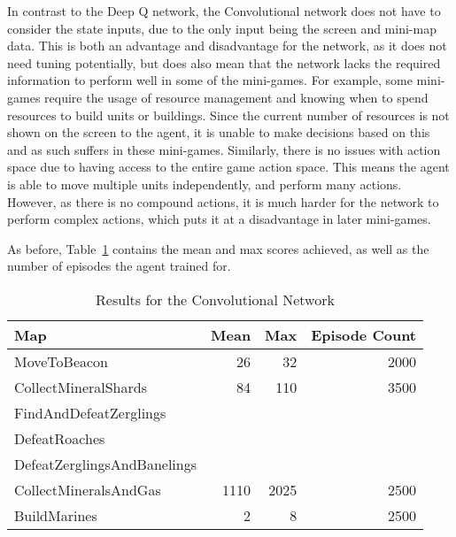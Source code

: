 In contrast to the Deep Q network, the Convolutional network does not have to
consider the state inputs, due to the only input being the screen and mini-map
data. This is both an advantage and disadvantage for the network, as it does not
need tuning potentially, but does also mean that the network lacks the required
information to perform well in some of the mini-games. For example, some
mini-games require the usage of resource management and knowing when to spend
resources to build units or buildings. Since the current number of resources is
not shown on the screen to the agent, it is unable to make decisions based on
this and as such suffers in these mini-games.
Similarly, there is no issues with action space due to having access to the
entire game action space. This means the agent is able to move multiple units
independently, and perform many actions. However, as there is no compound
actions, it is much harder for the network to perform complex actions, which
puts it at a disadvantage in later mini-games.

As before, Table~\ref{tab:cnn_results} contains the mean and max
scores achieved, as well as the number of episodes the agent trained for.

\begin{table}[h]
    \centering
    \begin{tabular}{@{}lrrr@{}}
        \toprule
        Map                         & Mean & Max & Episode Count \\ \midrule
        MoveToBeacon                & 26 & 32 & 2000 \\
        CollectMineralShards        & 84 & 110 & 3500 \\
        FindAndDefeatZerglings      &      &     &               \\
        DefeatRoaches               &      &     &               \\
        DefeatZerglingsAndBanelings &      &     &               \\
        CollectMineralsAndGas       & 1110 & 2025 & 2500 \\
        BuildMarines                & 2 & 8 & 2500 \\ \bottomrule
    \end{tabular}
    \caption{Results for the Convolutional Network}%
    \label{tab:cnn_results}%
\end{table}

